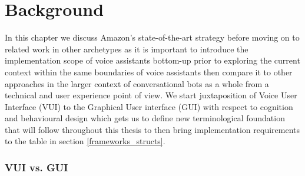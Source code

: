 \chapter{Background}
\label{background}




In this chapter we discuss Amazon's state-of-the-art strategy before moving on to related work in other archetypes as it is important to introduce the implementation scope of voice assistants bottom-up prior to exploring the current context within the same boundaries of voice assistants then compare it to other approaches in the larger context of conversational bots as a whole from a technical and user experience point of view. We start juxtaposition of Voice User Interface (VUI) to the Graphical User interface (GUI) with respect to cognition and behavioural design which gets us to define new terminological foundation that will follow throughout this thesis to then bring implementation requirements to the table in section \ref{frameworks_structs}. 



\subsection*{VUI vs. GUI} 

